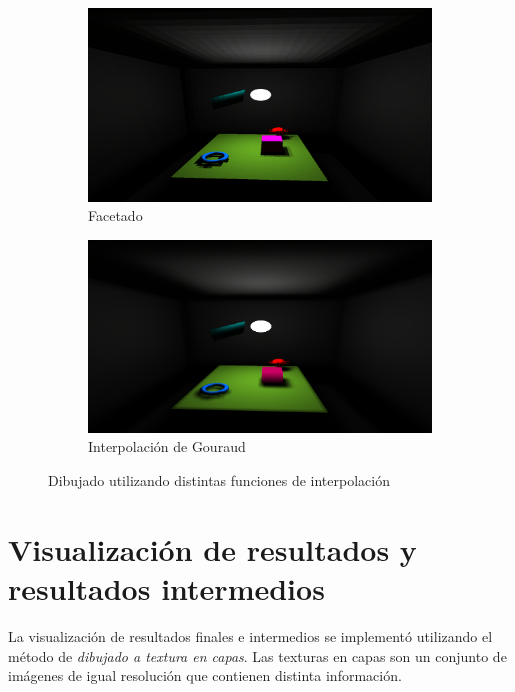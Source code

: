 \begin{figure}[htbp!]
	\centering
	\begin{subfigure}{0.7\textwidth}
		\centering
		\includegraphics[width=1\linewidth]{assets/cornell-flat}
		\caption{Facetado}
	\end{subfigure}
	\begin{subfigure}{0.7\textwidth}
		\centering
		\includegraphics[width=1\linewidth]{assets/cornell-gouraud}
		\caption{Interpolación de Gouraud}
	\end{subfigure}
	\caption{Dibujado utilizando distintas funciones de interpolación}
	\label{img:interpolationres}
\end{figure}

\section {Visualización de resultados y resultados intermedios}

La visualización de resultados finales e intermedios se implementó utilizando el método de \textit{dibujado a textura en capas}. Las texturas en capas son un conjunto de imágenes de igual resolución que contienen distinta información.

